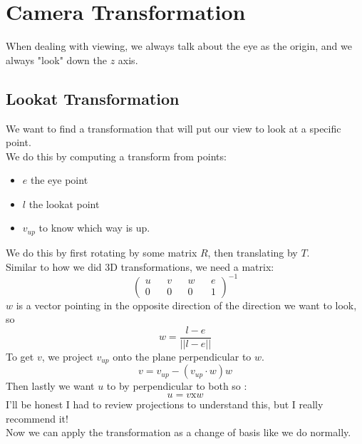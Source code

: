 \documentclass[12pt]{article}
\theoremstyle{definition}
\begin{document}
\section{Camera Transformation}
When dealing with viewing, we always talk about the eye as the origin, and we always "look" down the $z$ axis. 
\\ \linebreak

\subsection{Lookat Transformation}
We want to find a transformation that will put our view to look at a specific point. 
\\ \linebreak
We do this by computing a transform from points: 
\begin{itemize}
\item $e$ the eye point
\item $l$ the lookat point
\item $v_{up}$ to know which way is up.
\end{itemize}
We do this by first rotating by some matrix $R$, then translating by $T$.
\\ \linebreak
Similar to how we did 3D transformations, we need a matrix:
$$\begin{pmatrix}
u && v && w && e \\
0 && 0 && 0 && 1
\end{pmatrix}^{-1}$$
$w$ is a vector pointing in the opposite direction of the direction we want to look, so 
$$ w = \frac{l-e}{||l-e||}$$
To get $v$, we project $v_{up}$ onto the plane perpendicular to $w$.
$$v = v_{up} - (v_{up} \cdot w)w$$
Then lastly we want $u$ to by perpendicular to both so :
$$ u = v \text{x} w$$
I'll be honest I had to review projections to understand this, but I really recommend it!
\\ \linebreak
Now we can apply the transformation as a change of basis like we do normally.
\\ \linebreak
\end{document}
